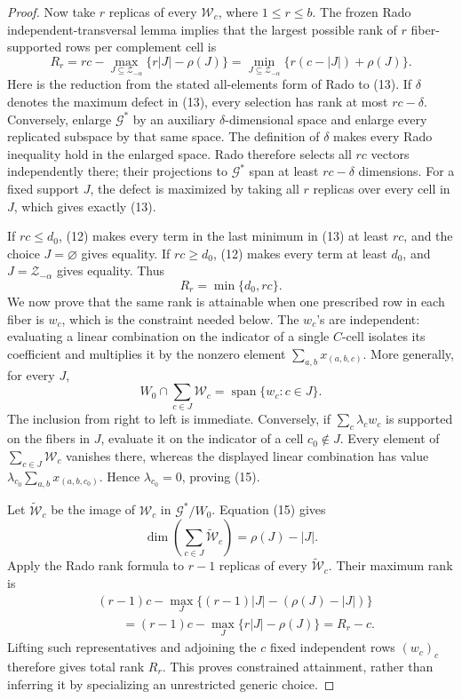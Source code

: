 \documentclass{article}
\begin{document}
\begin{proof}
Now take \(r\) replicas of every \(\mathscr W_c\), where \(1\le r\le b\).
The frozen Rado independent-transversal lemma implies that the largest possible
rank of \(r\) fiber-supported rows per complement cell is
\[
R_r=rc-\max_{J\subseteq\mathcal Z_{-\alpha}}
\{r\lvert J\rvert-\rho(J)\}
=\min_{J\subseteq\mathcal Z_{-\alpha}}
\{r(c-\lvert J\rvert)+\rho(J)\}.
\tag{13}
\]
Here is the reduction from the stated all-elements form of Rado to (13).  If
\(\delta\) denotes the maximum defect in (13), every selection has rank at most
\(rc-\delta\).  Conversely, enlarge \(\mathscr G^*\) by an auxiliary
\(\delta\)-dimensional space and enlarge every replicated subspace by that same
space.  The definition of \(\delta\) makes every Rado inequality hold in the
enlarged space.  Rado therefore selects all \(rc\) vectors independently there;
their projections to \(\mathscr G^*\) span at least \(rc-\delta\) dimensions.
For a fixed support \(J\), the defect is maximized by taking all \(r\) replicas
over every cell in \(J\), which gives exactly (13).

If \(rc\le d_0\), (12) makes every term in the last minimum in (13) at least
\(rc\), and the choice \(J=\varnothing\) gives equality.  If \(rc\ge d_0\),
(12) makes every term at least \(d_0\), and \(J=\mathcal Z_{-\alpha}\) gives
equality.  Thus
\[
R_r=\min\{d_0,rc\}.
\tag{14}
\]
We now prove that the same rank is attainable when one prescribed row in each
fiber is \(w_c\), which is the constraint needed below.  The \(w_c\)'s are
independent: evaluating a linear combination on the indicator of a single
\(C\)-cell isolates its coefficient and multiplies it by the nonzero element
\(\sum_{a,b}x_{(a,b,c)}\).  More generally, for every \(J\),
\[
W_0\cap\sum_{c\in J}\mathscr W_c
=\operatorname{span}\{w_c:c\in J\}.
\tag{15}
\]
The inclusion from right to left is immediate.  Conversely, if
\(\sum_c\lambda_cw_c\) is supported on the fibers in \(J\), evaluate it on the
indicator of a cell \(c_0\notin J\).  Every element of
\(\sum_{c\in J}\mathscr W_c\) vanishes there, whereas the displayed linear
combination has value
\(\lambda_{c_0}\sum_{a,b}x_{(a,b,c_0)}\).  Hence
\(\lambda_{c_0}=0\), proving (15).

Let \(\widetilde{\mathscr W}_c\) be the image of \(\mathscr W_c\) in
\(\mathscr G^*/W_0\).  Equation (15) gives
\[
\dim\left(\sum_{c\in J}\widetilde{\mathscr W}_c\right)
=\rho(J)-|J|.
\tag{16}
\]
Apply the Rado rank formula to \(r-1\) replicas of every
\(\widetilde{\mathscr W}_c\).  Their maximum rank is
\[
\begin{aligned}
&(r-1)c-\max_J\{(r-1)|J|-(\rho(J)-|J|)\}\\
&\qquad=(r-1)c-\max_J\{r|J|-\rho(J)\}=R_r-c.
\end{aligned}
\tag{17}
\]
Lifting such representatives and adjoining the \(c\) fixed independent rows
\((w_c)_c\) therefore gives total rank \(R_r\).  This proves constrained
attainment, rather than inferring it by specializing an unrestricted generic
choice.


\end{proof}
\end{document}
